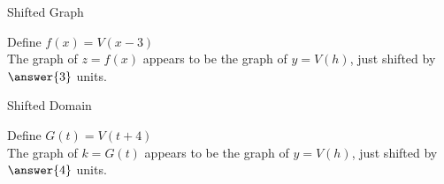 \documentclass{ximera}
\begin{document}
\begin{exercise}
\begin{question} Shifted Graph 

Define $f(x) = V(x - 3)$ \\


The graph of $z = f(x)$ appears to be the graph of $y = V(h)$, just shifted  by $\answer{3}$ units.

\end{question}















\begin{question} Shifted Domain 

Define $G(t) = V(t + 4)$ \\


The graph of $k = G(t)$ appears to be the graph of $y = V(h)$, just shifted  by $\answer{4}$ units.

\end{question}







\end{exercise}
\end{document}
